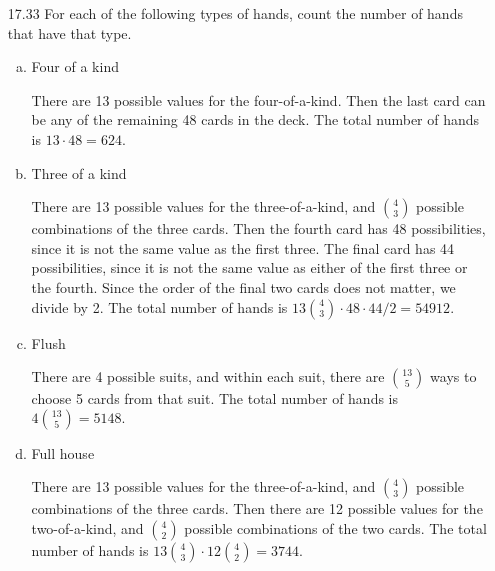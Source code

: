 \documentclass{article}
\begin{document}
\begin{itemize}
\begin{proof}
			Consider the LHS as a group of $n$ people, and we are choosing a subgroup of $k$ people, in $\binom{n}{k}$ ways, then among those $k$ people, we choose $m$ leaders, in $\binom{k}{m}$ ways, for a total of $\binom{n}{k}\binom{k}{m}$ choices. The RHS is the same group of $n$ people, but we choose the $m$ leaders immediately, in $\binom{n}{m}$ ways. Then among the remaining $n-m$ people, choose $k-m$ people to be the rest of the subgroup, in $\binom{n-m}{k-m}$ ways, for a total of $\binom{n}{m}\binom{n-m}{k-m}$ choices. These two methods produce the same subgroups and leaders, so the number of possible combinations is the same.
		\end{proof}

	\item[17.33] For each of the following types of hands, count the number of hands that have that type.
		\begin{enumerate}[a.]
			\item Four of a kind
				\begin{soln}
					There are 13 possible values for the four-of-a-kind. Then the last card can be any of the remaining 48 cards in the deck. The total number of hands is $13\cdot 48=\boxed{624.}$
				\end{soln}

			\item Three of a kind
				\begin{soln}
					There are 13 possible values for the three-of-a-kind, and $\binom{4}{3}$ possible combinations of the three cards. Then the fourth card has 48 possibilities, since it is not the same value as the first three. The final card has 44 possibilities, since it is not the same value as either of the first three or the fourth. Since the order of the final two cards does not matter, we divide by 2. The total number of hands is $13\binom{4}{3}\cdot 48\cdot 44/2=\boxed{54912.}$
				\end{soln}

			\item Flush
				\begin{soln}
					There are 4 possible suits, and within each suit, there are $\binom{13}{5}$ ways to choose 5 cards from that suit. The total number of hands is $4\binom{13}{5}=\boxed{5148.}$	
				\end{soln}

			\item Full house
				\begin{soln}
					There are 13 possible values for the three-of-a-kind, and $\binom{4}{3}$ possible combinations of the three cards. Then there are 12 possible values for the two-of-a-kind, and $\binom{4}{2}$ possible combinations of the two cards. The total number of hands is $13\binom{4}{3}\cdot 12\binom{4}{2} = \boxed{3744.}$
				\end{soln}


\end{enumerate}
\end{itemize}
\end{document}

